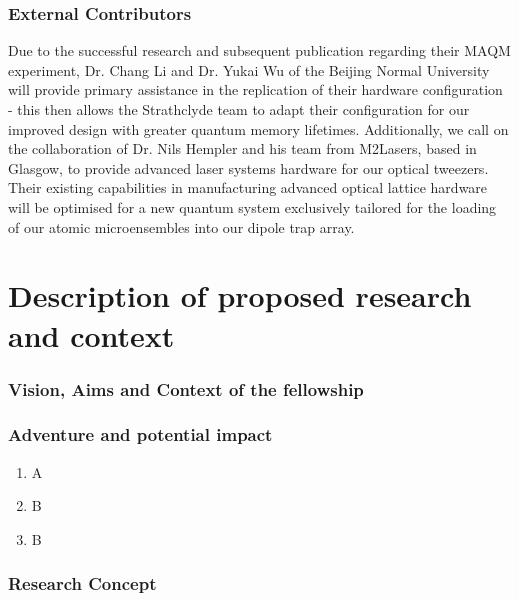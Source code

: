 \documentclass{epsrc}
\begin{document}
\section{External Contributors}

Due to the successful research and subsequent publication regarding their MAQM experiment, Dr. Chang Li and
Dr. Yukai Wu of the Beijing Normal University will provide primary assistance in the replication of their hardware configuration - this then allows the Strathclyde team to adapt their configuration for our improved design with greater quantum memory lifetimes. Additionally, we call on the collaboration of Dr. Nils Hempler and his team from M2Lasers, based in Glasgow, to provide advanced laser systems hardware for our optical tweezers. Their existing capabilities in manufacturing advanced optical lattice hardware will be optimised for a new quantum system exclusively tailored for the loading of our atomic microensembles into our dipole trap array. \\


\newpage

\part{Description of proposed research and context}

\section{Vision, Aims and Context of the fellowship}

\lipsum[15-16]

\section{Adventure and potential impact}

\lipsum[17-18]

\begin{enumerate}[label=\roman*.]
	\item A
	\item B
	\item B
\end{enumerate}

\section{Research Concept}
\end{document}
